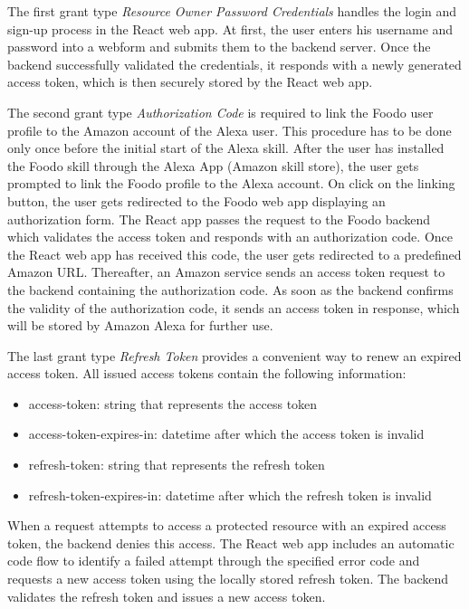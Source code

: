 The first grant type \textit{Resource Owner Password Credentials} handles the login and sign-up process in the React web app. At first, the user enters his username and password into a webform and submits them to the backend server. Once the backend successfully validated the credentials, it responds with a newly generated access token, which is then securely stored by the React web app.

The second grant type \textit{Authorization Code} is required to link the Foodo user profile to the Amazon account of the Alexa user. This procedure has to be done only once before the initial start of the Alexa skill. After the user has installed the Foodo skill through the Alexa App (Amazon skill store), the user gets prompted to link the Foodo profile to the Alexa account. On click on the linking button, the user gets redirected to the Foodo web app displaying an authorization form. The React app passes the request to the Foodo backend which validates the access token and responds with an authorization code. Once the React web app has received this code, the user gets redirected to a predefined Amazon URL. Thereafter, an Amazon service sends an access token request to the backend containing the authorization code. As soon as the backend confirms the validity of the authorization code, it sends an access token in response, which will be stored by Amazon Alexa for further use. 

The last grant type \textit{Refresh Token} provides a convenient way to renew an expired access token. All issued access tokens contain the following information:
\vspace{-1em}
\begin{itemize}
	\itemsep-0.5em
	\item access-token: string that represents the access token
	\item access-token-expires-in: datetime after which the access token is invalid
	\item refresh-token: string that represents the refresh token
	\item refresh-token-expires-in: datetime after which the refresh token is invalid
\end{itemize}


When a request attempts to access a protected resource with an expired access token, the backend denies this access. The React web app includes an automatic code flow to identify a failed attempt through the specified error code and requests a new access token using the locally stored refresh token. The backend validates the refresh token and issues a new access token.

